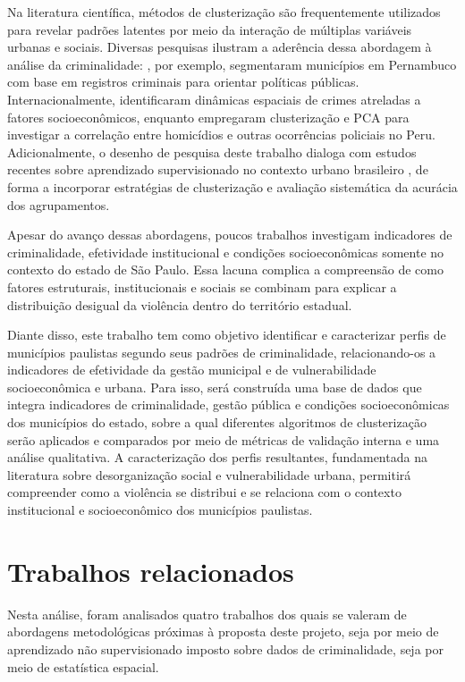 \documentclass[12pt]{article}
\begin{document}
Na literatura científica, métodos de clusterização são frequentemente utilizados para revelar padrões latentes por meio da interação de múltiplas variáveis urbanas e sociais. Diversas pesquisas ilustram a aderência dessa abordagem à análise da criminalidade: \cite{costasilva2022}, por exemplo, segmentaram municípios em Pernambuco com base em registros criminais para orientar políticas públicas. Internacionalmente, \cite{wang2013} identificaram dinâmicas espaciais de crimes atreladas a fatores socioeconômicos, enquanto \cite{gonzalez2026} empregaram clusterização e PCA para investigar a correlação entre homicídios e outras ocorrências policiais no Peru. Adicionalmente, o desenho de pesquisa deste trabalho dialoga com estudos recentes sobre aprendizado supervisionado no contexto urbano brasileiro \cite{silva2025}, de forma a incorporar estratégias de clusterização e avaliação sistemática da acurácia dos agrupamentos.

Apesar do avanço dessas abordagens, poucos trabalhos investigam indicadores de criminalidade, efetividade institucional e condições socioeconômicas somente  no contexto do estado de São Paulo. Essa lacuna complica a compreensão de como fatores estruturais, institucionais e sociais se combinam para explicar a distribuição desigual da violência dentro do território estadual.

Diante disso, este trabalho tem como objetivo identificar e caracterizar perfis
de municípios paulistas segundo seus padrões de criminalidade, relacionando-os
a indicadores de efetividade da gestão municipal e de vulnerabilidade socioeconômica
e urbana. Para isso, será construída uma base de dados que integra indicadores de
criminalidade, gestão pública e condições socioeconômicas dos municípios do estado,
sobre a qual diferentes algoritmos de clusterização serão aplicados e comparados
por meio de métricas de validação interna e uma análise qualitativa. A caracterização dos perfis resultantes, fundamentada na literatura sobre desorganização social e vulnerabilidade urbana,
permitirá compreender como a violência se distribui e se relaciona com o contexto
institucional e socioeconômico dos municípios paulistas.


\section{Trabalhos relacionados}
Nesta análise, foram analisados quatro trabalhos dos quais se valeram de abordagens metodológicas próximas à proposta deste projeto, seja por meio de aprendizado não supervisionado imposto sobre dados de criminalidade, seja por meio de estatística espacial.
\end{document}
